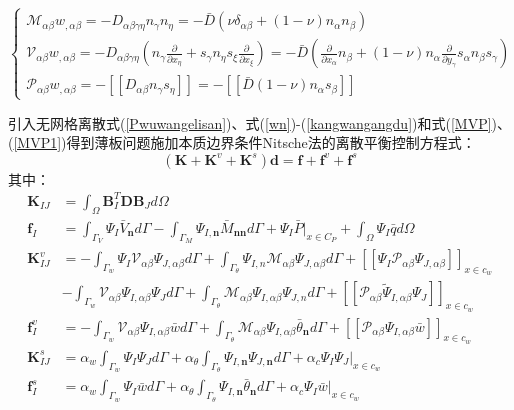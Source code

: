 \begin{equation}
\begin{cases}\label{MVP1}
 \mathcal{M}_{\alpha\beta}w_{,\alpha\beta}=-D_{\alpha\beta\gamma\eta}n_{\gamma}n_{\eta}=-\bar{D}(\nu\delta_{\alpha\beta}+(1-\nu)n_{\alpha}n_{\beta})\\
  \mathcal{V}_{\alpha\beta}w_{,\alpha\beta}=-D_{\alpha\beta\gamma\eta}(n_{\gamma}\frac{\partial}{\partial x_{\eta}}+s_{\gamma}n_{\eta}s_{\xi}\frac{\partial}{\partial x_{\xi}})
  =-\bar{D}(\frac{\partial}{\partial x_{\alpha}}n_{\beta}+(1-\nu)n_{\alpha}\frac{\partial}{\partial y_{\gamma}}s_{\alpha}n_{\beta}s_{\gamma})\\
 \mathcal{P}_{\alpha\beta}w_{,\alpha\beta}=-[[D_{\alpha\beta}n_{\gamma}s_{\eta}]]=-[[\bar{D}(1-\nu)n_{\alpha}s_{\beta}]]
\end{cases}
\end{equation}\par
引入无网格离散式(\ref{Pwuwangelisan})、式(\ref{wn})-(\ref{kangwangangdu})和式(\ref{MVP})、(\ref{MVP1})得到薄板问题施加本质边界条件Nitsche法的离散平衡控制方程式：
\begin{equation}
    (\pmb{K}+\pmb{K}^v+\pmb{K}^s)\pmb{d}=\pmb{f}+\pmb{f}^v+\pmb{f}^s
\end{equation}
其中：
\begin{subequations}
\begin{align}
    \pmb K_{I\!J}&=\int_{\Omega}\pmb{B}^T_I\pmb{D}\pmb{B}_Jd\Omega\\
    \pmb f_I&=\int_{\Gamma_V}\Psi_I\bar{V}_{\pmb{n}}d\Gamma-\int_{\Gamma_M}\Psi_{I,\pmb{n}}\bar{M}_{\pmb{nn}}d\Gamma+\Psi_I\bar{P}\vert_{x\in C_P}+\int_{\Omega}\Psi_I\bar{q}d\Omega\\
     \pmb K^v_{I\!J}&=-\int_{\Gamma_w}\Psi_I\mathcal{V}_{\alpha\beta}\Psi_{J,\alpha\beta}d\Gamma+\int_{\Gamma_{\theta}}\Psi_{I,n}\mathcal{M}_{\alpha\beta}\Psi_{J,\alpha\beta}d\Gamma+[[\Psi_I\mathcal{P}_{\alpha\beta}\Psi_{J,\alpha\beta}]]_{x\in{c_w}}\\
     &-\int_{\Gamma_w}\mathcal{V}_{\alpha\beta}\Psi_{I,\alpha\beta}\Psi_Jd\Gamma+\int_{\Gamma_{\theta}}\mathcal{M}_{\alpha\beta}\Psi_{I,\alpha\beta}\Psi_{J,n}d\Gamma+[[\mathcal{P}_{\alpha\beta}\tilde{\Psi}_{I,\alpha\beta}\Psi_J]]_{x\in{c_w}}\\
     \pmb f_{I}^v&=-\int_{\Gamma_w}\mathcal{V}_{\alpha\beta}\Psi_{I,\alpha\beta}\bar{w}d\Gamma+\int_{\Gamma_{\theta}}\mathcal{M}_{\alpha\beta}\Psi_{I,\alpha\beta}\bar{\theta}_{\pmb n}d\Gamma+[[\mathcal{P}_{\alpha\beta}\Psi_{I,\alpha\beta}\bar{w}]]_{x\in{c_w}}\\
    \pmb K^s_{I\!J}&=\alpha_w\int_{\Gamma_w}\Psi_I\Psi_Jd\Gamma+\alpha_{\theta}\int_{\Gamma_{\theta}}\Psi_{I,\pmb n}\Psi_{J,\pmb n}d\Gamma+\alpha_c\Psi_I\Psi_J\vert_{x\in c_w}\\
   \pmb f^s_I&=\alpha_w\int_{\Gamma_w}\Psi_I\bar{w}d\Gamma+\alpha_{\theta}\int_{\Gamma_{\theta}}\Psi_{I,\pmb n}\bar{\theta}_{\pmb n}d\Gamma+\alpha_c\Psi_I\bar{w}\vert_{x\in c_w}
\end{align}
\end{subequations}\par
